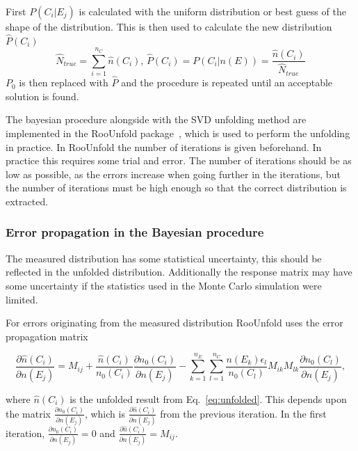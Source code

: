 First  $P\left(C_i |E_j\right)$ is calculated with the uniform distribution or best guess of the shape of the distribution. This is then used to calculate the new distribution $\hat P\left(C_i\right)$
$$\hat N_{true} = \sum_{i=1}^{n_C} \hat n\left(C_i\right),\,\hat P\left(C_i\right) = P\left(C_i | n\left(E\right)\right) = \frac{\hat n\left(C_i\right)}{\hat N_{true}}$$
$P_0$ is then replaced with $\hat P$ and the procedure is repeated until an acceptable solution is found. 

The bayesian procedure alongside with the SVD unfolding method are implemented in the RooUnfold package~\cite{roounfold}, which is used to perform the unfolding in practice. In RooUnfold the number of iterations is given beforehand. In practice this requires some trial and error. The number of iterations should be as low as possible, as the errors increase when going further in the iterations, but the number of iterations must be high enough so that the correct distribution is extracted. 
 
 \subsubsection*{Error propagation in the Bayesian procedure }
 The measured distribution has some statistical uncertainty, this should be reflected in the unfolded distribution. Additionally the response matrix may have some uncertainty if the statistics used in the Monte Carlo simulation were limited. 
 
For errors originating from the measured distribution RooUnfold uses the error propagation matrix 

\begin{equation}
\frac{\partial \hat n\left(C_i\right)}{\partial n\left(E_j\right)} = M_{ij} + \frac{\hat n\left(C_i\right)}{n_0\left(C_i\right)}\frac{\partial n_0\left(C_i\right) }{\partial n\left(E_j\right) } - \sum_{k=1}^{n_E}\sum_{l=1}^{n_C} \frac{n\left(E_k\right) \epsilon_l}{n_0\left(C_l\right)} M_{ik} M_{lk} \frac{\partial n_0 \left(C_l\right)}{\partial n\left(E_j\right)},
\end{equation} 
 
 where $\hat n \left(C_i\right)$ is the unfolded result from Eq.~\ref{eq:unfolded}. This depends upon the matrix $\frac{\partial n_0\left(C_i\right)}{\partial n\left(E_j\right) }$, which is $\frac{\partial \hat n\left(C_i\right) }{\partial n\left(E_j\right) }$ from the previous iteration. In the first iteration, $\frac{\partial n_0\left(C_i\right) }{\partial n\left(E_j\right) }=0$ and $\frac{\partial \hat n\left(C_i\right) }{\partial n\left(E_j\right) } = M_{ij}$.
 

